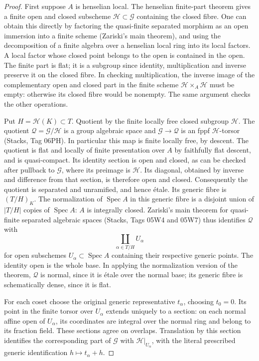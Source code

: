 \begin{proof}
First suppose \(A\) is henselian local. The henselian finite-part
theorem gives a finite open and closed subscheme
\(\mathscr H\subset\mathscr G\) containing the closed fibre.
One can obtain this directly by factoring the quasi-finite
separated morphism as an open immersion into a finite scheme
(Zariski's main theorem), and using the decomposition of a
finite algebra over a henselian local ring into its local
factors. A local factor whose closed point belongs to the open
is contained in the open. The finite part is flat; it is a
subgroup since identity, multiplication and inverse preserve
it on the closed fibre. In checking multiplication, the
inverse image of the complementary open and closed part in
the finite scheme \(\mathscr H\times_A\mathscr H\) must be
empty: otherwise its closed fibre would be nonempty.
The same argument checks the other operations.

Put \(H=\mathscr H(K)\subset T\). Quotient by the finite
locally free closed subgroup \(\mathscr H\). The quotient
\(\mathscr Q=\mathscr G/\mathscr H\) is a group algebraic
space and \(\mathscr G\to\mathscr Q\) is an fppf
\(\mathscr H\)-torsor (Stacks, Tag 06PH). In particular
this map is finite locally free, by descent.
The quotient is flat and locally of finite presentation over
\(A\) by faithfully flat descent, and is quasi-compact.
Its identity section is open and closed, as can be checked
after pullback to \(\mathscr G\), where its preimage is
\(\mathscr H\). Its diagonal, obtained by inverse and
difference from that section, is therefore open and closed.
Consequently the quotient is separated and unramified, and
hence \'etale. Its generic fibre is \((T/H)_K\).
The normalization of \(\operatorname{Spec}A\) in this
generic fibre is a disjoint union of \(|T/H|\) copies of
\(\operatorname{Spec}A\): \(A\) is integrally closed.
Zariski's main theorem for quasi-finite separated algebraic
spaces (Stacks, Tags 05W4 and 05W7) thus identifies
\(\mathscr Q\) with
\[
                      \coprod_{\alpha\in T/H} U_\alpha
\]
for open subschemes \(U_\alpha\subset\operatorname{Spec}A\)
containing their respective generic points. The identity open
is the whole base. In applying the normalization version of
the theorem, \(\mathscr Q\) is normal, since it is \'etale
over the normal base; its generic fibre is schematically
dense, since it is flat.

For each coset choose the original generic representative
\(t_\alpha\), choosing \(t_0=0\). Its point in the finite
torsor over \(U_\alpha\) extends uniquely to a section:
on each normal affine open of \(U_\alpha\), its coordinates
are integral over the normal ring and belong to its fraction
field. These sections agree on overlaps. Translation by
this section identifies the corresponding part of
\(\mathscr G\) with \(\mathscr H|_{U_\alpha}\), with the
literal prescribed generic identification \(h\mapsto
t_\alpha+h\).


\end{proof}
